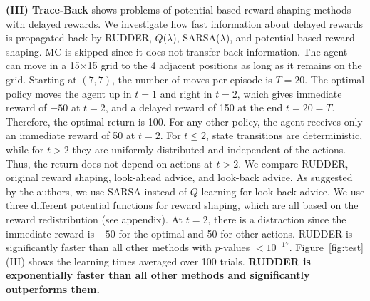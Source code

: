 \documentclass{article}
\renewcommand{\leq}{\leqslant}
\begin{document}
{\bf (III) Trace-Back} 
shows problems of potential-based reward shaping methods
with delayed rewards.
We investigate how fast information about delayed rewards 
is propagated back by
RUDDER, $Q$($\lambda$), SARSA($\lambda$), 
and potential-based reward shaping.
MC is skipped since it does not 
transfer back information.
The agent can move in a 15$\times$15 grid
to the 4 adjacent positions as long as it remains on the grid.
Starting at $(7,7)$, the number of moves per episode is $T=20$. 
The optimal policy moves the agent up in $t=1$ and  
right in $t=2$, 
which gives immediate reward of $-50$ at $t=2$, 
and a delayed reward of 150 at the end $t=20=T$. 
Therefore, the optimal return is 100.
For any other policy, 
the agent receives only an immediate reward of 50 at $t=2$.
For $t\leq 2$, state transitions are deterministic, while
for $t>2$ they are uniformly distributed and 
independent of the actions.
Thus, the return does not depend on actions at $t>2$.
We compare RUDDER, original reward shaping, 
look-ahead advice, and look-back advice. 
As suggested by the authors, we use SARSA instead of $Q$-learning 
for look-back advice. 
We use three different potential functions for reward shaping,
which are all based on the reward redistribution 
(see appendix). 
At $t=2$, there is a distraction since the immediate 
reward is $-50$ for the optimal and 50 for other actions. 
RUDDER is significantly faster than all other methods
with $p$-values $<10^{-17}$.
Figure~\ref{fig:test}(III) shows the 
learning times averaged over 100 trials.
{\bf RUDDER is exponentially faster than 
all other methods and significantly outperforms them.}
\end{document}
